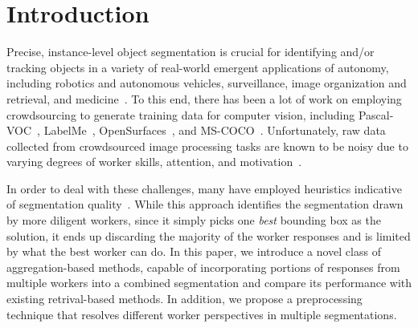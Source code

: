 \section{Introduction\label{sec:intro}}
Precise, instance-level object segmentation is crucial for identifying and/or tracking objects in a variety of real-world emergent applications of autonomy, including robotics and autonomous vehicles, surveillance, image organization and retrieval, and medicine~\cite{Irshad2014,Yamaguchi2012}. To this end, there has been a lot of work on employing crowdsourcing to generate training data for computer vision, including Pascal-VOC~\cite{Everingham15}, LabelMe~\cite{Torralba2010}, OpenSurfaces~\cite{bell15minc}, and MS-COCO~\cite{Lin2012}. Unfortunately, raw data collected from crowdsourced image processing tasks are known to be noisy due to varying degrees of worker skills, attention, and motivation~\cite{bell14intrinsic,MDWWelinder2010}. 
\par In order to deal with these challenges, many have employed heuristics indicative of segmentation quality~\cite{Cabezas2015,Sameki2015,Sorokin2008}. While this approach identifies the segmentation drawn by more diligent workers, since it simply picks one \textit{best} bounding box as the solution, it ends up discarding the majority of the worker responses and is limited by what the best worker can do. In this paper, we introduce a novel class of aggregation-based methods, capable of incorporating portions of responses from multiple workers into a combined segmentation and compare its performance with existing retrival-based methods. In addition, we propose a preprocessing technique that resolves different worker perspectives in multiple segmentations. 